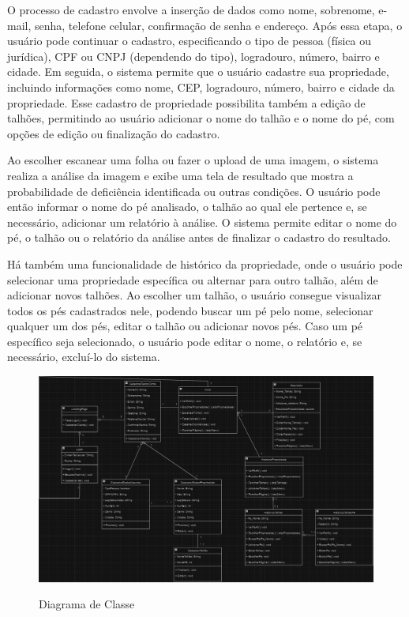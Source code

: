 O processo de cadastro envolve a inserção de dados como nome, sobrenome, e-mail, senha, telefone celular, confirmação de senha e endereço. Após essa etapa, o usuário pode continuar o cadastro, especificando o tipo de pessoa (física ou jurídica), CPF ou CNPJ (dependendo do tipo), logradouro, número, bairro e cidade. Em seguida, o sistema permite que o usuário cadastre sua propriedade, incluindo informações como nome, CEP, logradouro, número, bairro e cidade da propriedade. Esse cadastro de propriedade possibilita também a edição de talhões, permitindo ao usuário adicionar o nome do talhão e o nome do pé, com opções de edição ou finalização do cadastro.

Ao escolher escanear uma folha ou fazer o upload de uma imagem, o sistema realiza a análise da imagem e exibe uma tela de resultado que mostra a probabilidade de deficiência identificada ou outras condições. O usuário pode então informar o nome do pé analisado, o talhão ao qual ele pertence e, se necessário, adicionar um relatório à análise. O sistema permite editar o nome do pé, o talhão ou o relatório da análise antes de finalizar o cadastro do resultado.

Há também uma funcionalidade de histórico da propriedade, onde o usuário pode selecionar uma propriedade específica ou alternar para outro talhão, além de adicionar novos talhões. Ao escolher um talhão, o usuário consegue visualizar todos os pés cadastrados nele, podendo buscar um pé pelo nome, selecionar qualquer um dos pés, editar o talhão ou adicionar novos pés. Caso um pé específico seja selecionado, o usuário pode editar o nome, o relatório e, se necessário, excluí-lo do sistema.

\begin{figure}[H]
\centering
\caption{Diagrama de Classe}
\includegraphics[width=0.7\linewidth]{Illustrations/diagramaClasse.png}
\label{fig:diagrama-classe}
\end{figure}

